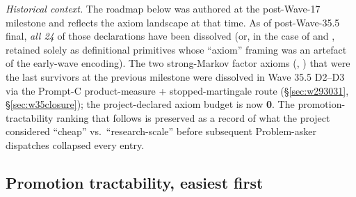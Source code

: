 \documentclass[11pt,a4paper]{article}
\theoremstyle{plain}
\theoremstyle{definition}
\begin{document}
\emph{Historical context.} The roadmap below was authored at the
post-Wave-17 milestone and reflects the axiom landscape at that
time. As of post-Wave-35.5 final, \emph{all 24} of those
declarations have been dissolved (or, in the case of
 and , retained
solely as definitional primitives whose ``axiom'' framing was an
artefact of the early-wave encoding). The two strong-Markov factor
axioms (,
) that were the last survivors at the previous
milestone were dissolved in Wave 35.5 D2--D3 via the Prompt-C
product-measure + stopped-martingale route (\S\ref{sec:w293031},
\S\ref{sec:w35closure}); the project-declared axiom budget is
now \textbf{0}. The promotion-tractability ranking that follows
is preserved as a record of what the project considered ``cheap''
vs.\ ``research-scale'' before subsequent Problem-asker dispatches
collapsed every entry.

\subsection*{Promotion tractability, easiest first}
\end{document}

